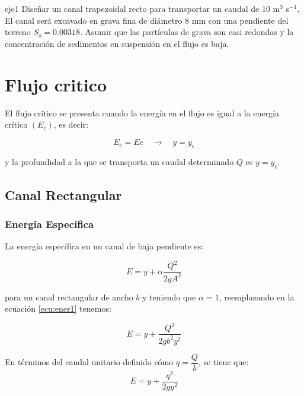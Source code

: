 \documentclass[11pt, oneside]{article}
\begin{document}
\begin{eje}{}{eje1}
Diseñar un canal trapezoidal recto para transportar un caudal de 10 m$^3$ s$^{-1}$. El canal ser\'a excavado en grava fina de di\'ametro 8 mm  con una pendiente del terreno $S_o = 0.00318$. Asumir que las part\'iculas de grava son casi redondas y la concentraci\'on de sedimentos en suspensi\'on en el flujo es baja. 
\end{eje}

\section{Flujo critico}

El flujo crítico se presenta cuando la energía en el flujo es igual a la energía crítica $(E_c)$, es decir:

\begin{equation}
    E_c=Ec \quad \rightarrow \quad y=y_c
    \nonumber
\end{equation}

y la profundidad a la que se transporta un caudal determinado $Q$ es $y=y_c$.

\subsection{Canal Rectangular}

\subsubsection{Energía Específica}

La energía específica en un canal de baja pendiente es:

\begin{equation}
    E=y+\alpha \dfrac{Q^{2}}{2gA^{2}}
    \label{ecu:ener1}
\end{equation}

para un canal rectangular de ancho $b$ y teniendo que $\alpha=1$, reemplazando en la ecuación \ref{ecu:ener1} tenemos:

\begin{equation}
    E=y+\dfrac{Q^{2}}{2gb^{2}y^{2}}
\end{equation}

En términos del caudal unitario definido cómo $q=\dfrac{Q}{b}$, se tiene que:
\begin{equation}
    E=y+\dfrac{q^{2}}{2gy^{2}}
\end{equation}
\end{document}
